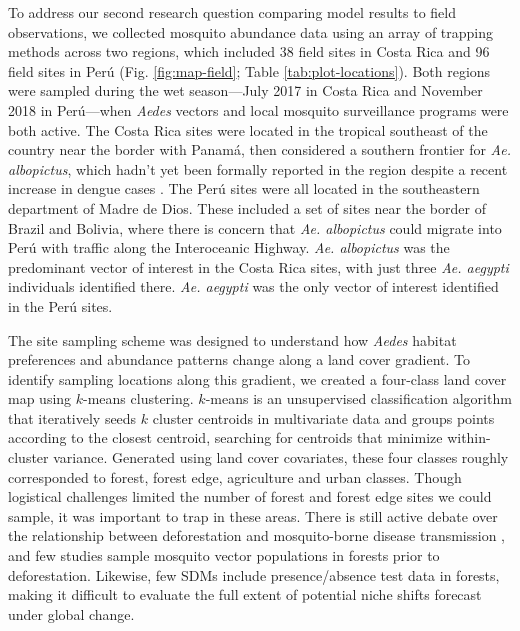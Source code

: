 To address our second research question comparing model results to field observations, we collected mosquito abundance data using an array of trapping methods across two regions, which included 38 field sites in Costa Rica and 96 field sites in Perú (Fig. \ref{fig:map-field}; Table \ref{tab:plot-locations}). Both regions were sampled during the wet season—July 2017 in Costa Rica and November 2018 in Perú—when \textit{Aedes} vectors and local mosquito surveillance programs were both active. The Costa Rica sites were located in the tropical southeast of the country near the border with Panamá, then considered a southern frontier for \textit{Ae. albopictus}, which hadn’t yet been formally reported in the region despite a recent increase in dengue cases \cite{Gutierrez2015-hx}. The Perú sites were all located in the southeastern department of Madre de Dios. These included a set of sites near the border of Brazil and Bolivia, where there is concern that \textit{Ae. albopictus} could migrate into Perú with traffic along the Interoceanic Highway. \textit{Ae. albopictus} was the predominant vector of interest in the Costa Rica sites, with just three \textit{Ae. aegypti} individuals identified there. \textit{Ae. aegypti} was the only vector of interest identified in the Perú sites.

The site sampling scheme was designed to understand how \textit{Aedes} habitat preferences and abundance patterns change along a land cover gradient. To identify sampling locations along this gradient, we created a four-class land cover map using $k$-means clustering. $k$-means is an unsupervised classification algorithm that iteratively seeds $k$ cluster centroids in multivariate data and groups points according to the closest centroid, searching for centroids that minimize within-cluster variance. Generated using land cover covariates, these four classes roughly corresponded to forest, forest edge, agriculture and urban classes. Though logistical challenges limited the number of forest and forest edge sites we could sample, it was important to trap in these areas. There is still active debate over the relationship between deforestation and mosquito-borne disease transmission \cite{Norris2004-jr, Tucker_Lima2017-fd}, and few studies sample mosquito vector populations in forests prior to deforestation. Likewise, few SDMs include presence/absence test data in forests, making it difficult to evaluate the full extent of potential niche shifts forecast under global change.

